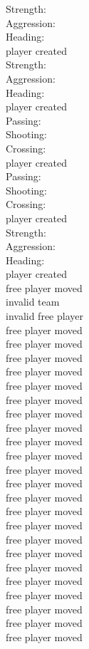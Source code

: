 \documentclass[]{article}
\begin{document}
{Strength:\\
Aggression:\\
Heading:\\
player created\\
Strength:\\
Aggression:\\
Heading:\\
player created\\
Passing:\\
Shooting:\\
Crossing:\\
player created\\
Passing:\\
Shooting:\\
Crossing:\\
player created\\
Strength:\\
Aggression:\\
Heading:\\
player created\\
free player moved\\
invalid team\\
invalid free player\\
free player moved\\
free player moved\\
free player moved\\
free player moved\\
free player moved\\
free player moved\\
free player moved\\
free player moved\\
free player moved\\
free player moved\\
free player moved\\
free player moved\\
free player moved\\
free player moved\\
free player moved\\
free player moved\\
free player moved\\
free player moved\\
free player moved\\
free player moved\\
free player moved\\
free player moved\\
free player moved\\
}
\end{document}
